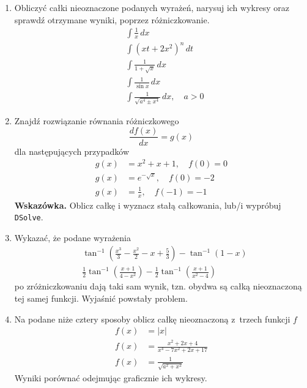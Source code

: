 \documentclass[a4paper,11pt]{article}
\begin{document}
\begin{enumerate}

\item Obliczyć całki nieoznaczone podanych wyrażeń, narysuj ich wykresy oraz sprawdź otrzymane wyniki, poprzez różniczkowanie.
  \begin{align}
    &\int \frac{ 1 }{ x } \, dx \\
    &\int ( xt + 2x^{ 2 } )^{ n } \, dt \\
    &\int \frac{ 1 }{ 1 + \sqrt{ x } } \, dx \\
    &\int \frac{ 1 }{ \sin x } \, dx \\
    &\int \frac{ 1 }{ \sqrt{ a^{ 4 } \pm x^{ 4 } } } \, dx, \quad
      a > 0
  \end{align}

\item Znajdź rozwiązanie równania różniczkowego
  \begin{equation}
    \label{eq:6}
    \frac{ d f( x ) }{ dx } = g( x )
  \end{equation}
  dla następujących przypadków
  \begin{align}
    g( x ) &= x^{ 2 } + x + 1, \quad
             f( 0 ) = 0 \\
    g( x ) &= e^{ -\sqrt{ x } }, \quad
             f( 0 ) = -2 \\
    g( x ) &= \frac{ 1 }{ x }, \quad
             f( -1 ) = -1
  \end{align}
  \textbf{Wskazówka.} Oblicz całkę i wyznacz stałą całkowania, lub/i wypróbuj \texttt{DSolve}.


\item Wykazać, że podane wyrażenia
  \begin{align}
    &\tan^{ -1 }\left( \frac{ x^{ 3 } }{ 3 } - \frac{ x^{ 2 } }{ 2 }
      - x + \frac{ 5 }{ 3 } \right)
      - \tan^{ -1 }( 1 - x ) \\
    &\frac{ 1 }{ 2 } \tan^{ -1 }\left( \frac{ x + 1 }{ 4 - x^{ 2 } } \right)
      - \frac{ 1 }{ 2 } \tan^{ -1 }\left( \frac{ x + 1 }{ x^{ 2 } - 4 }
      \right)
  \end{align}
  po zróżniczkowaniu dają taki sam wynik, tzn. obydwa są całką nieoznaczoną tej samej funkcji. Wyjaśnić powstały problem.

\item Na podane niże cztery sposoby oblicz całkę nieoznaczoną z~trzech funkcji $f$
  \begin{align}
    f( x ) &= | x | \\
    f( x ) &= \frac{ x^{ 2 } + 2x + 4 }{ x^{ 4 } - 7 x^{ 2 } + 2x + 17 } \\
    f( x ) &= \frac{ 1 }{ \sqrt{ a^{ 2 } + x^{ 2 } } }
  \end{align}
  Wyniki porównać odejmując graficznie ich wykresy.


\end{enumerate}
\end{document}
